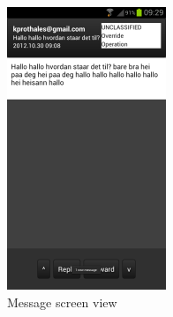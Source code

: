 \begin{figure}[h!]
\begin{center}
\includegraphics{viewmessage}
\end{center}
\caption{Message screen view} \label{fig:viewmessagegui}
\end{figure}

\newpage

